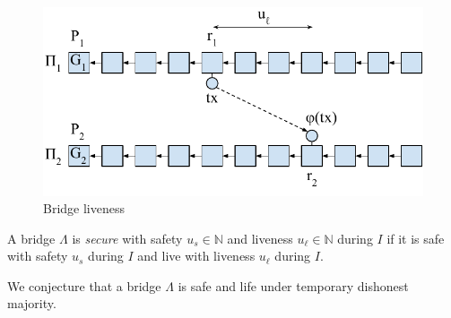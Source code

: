 \begin{figure}
    \center
    \includegraphics[width=0.8\columnwidth]{figures/bridge-liveness.pdf}
    \caption{Bridge liveness}
    \label{fig:bridge-liveness}
\end{figure}

\begin{definition}\label{def:bridge-security}
  A bridge $\Lambda$ is \emph{secure} with safety $u_s \in \mathbb{N}$ and
  liveness $u_\ell \in \mathbb{N}$ during $I$ if it is safe with safety $u_s$ during $I$
  and live with liveness $u_\ell$ during $I$.
\end{definition}

\begin{conjecture}\label{conj:bridge-security}
  We conjecture that a bridge $\Lambda$ is safe and life under temporary dishonest majority.
\end{conjecture}

